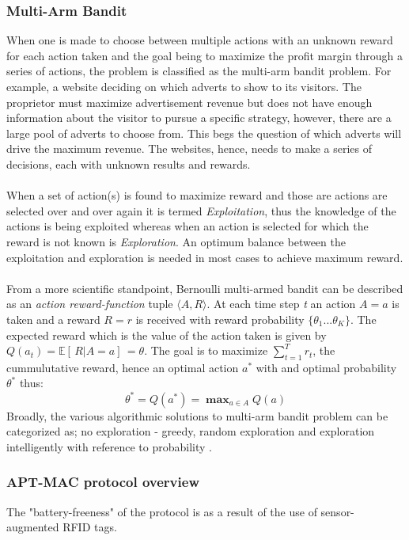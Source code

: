 \subsubsection{Multi-Arm Bandit}
When one is made to choose between multiple actions with an unknown reward for each action taken and the goal being to maximize the profit margin through a series of actions, the problem is classified as the multi-arm bandit problem.
For example, a website deciding on which adverts to show to its visitors.
The proprietor must maximize advertisement revenue but does not have enough information about the visitor to pursue a specific strategy, however, there are a large pool of adverts to choose from.
This begs the question of which adverts will drive the maximum revenue.
The websites, hence, needs to make a series of decisions, each with unknown results and rewards.\\\\
When a set of action(s) is found to maximize reward and those are actions are selected over and over again it is termed \textit{Exploitation}, thus the knowledge of the actions is being exploited whereas when an action is selected for which the reward is not known is \textit{Exploration}. An optimum balance between the exploitation and exploration is needed in most cases to achieve maximum reward.\\\\
From a more scientific standpoint, Bernoulli multi-armed bandit can be described as an \textit{action reward-function} tuple $\langle A,R \rangle$.
At each time step \textit{t} an action $A=a$ is taken and a reward $R=r$ is received with reward probability $\{\theta_1 ... \theta_K\}$.
The expected reward which is the value of the action taken is given by $Q(a_t) = \mathbb{E}[\,R | A=a]\,= \theta$.
The goal is to maximize $\sum\nolimits_{t=1}^T r_t$, the cummulutative reward, hence an optimal action $a^*$ with and optimal probability $\theta^*$ thus:
\begin{equation}
    \theta^* = Q(a^*) = \mathop{\textbf{max}}_{a{\in}A}Q(a)
\end{equation}
Broadly, the various algorithmic solutions to multi-arm bandit problem can be categorized as; no exploration - greedy, random exploration and exploration intelligently with reference to probability \cite{Sutton&Barto}.
\subsubsection{APT-MAC protocol overview}
The "battery-freeness" of the protocol is as a result of the use of sensor-augmented RFID tags.

